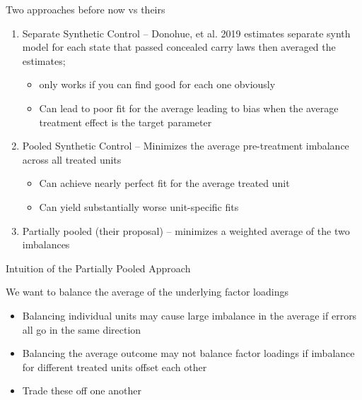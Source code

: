 \documentclass{beamer}
\begin{document}
\begin{frame}{Two approaches before now vs theirs}

\begin{enumerate}

\item Separate Synthetic Control -- Donohue, et al. 2019 estimates separate synth model for each state that passed concealed carry laws then averaged the estimates;
	\begin{itemize}
	\item  only works if you can find good for each one obviously
	\item Can lead to poor fit for the average leading to bias when the average treatment effect is the target parameter
	\end{itemize}
\item Pooled Synthetic Control -- Minimizes the average pre-treatment imbalance across all treated units
	\begin{itemize}
	\item Can achieve nearly perfect fit for the average treated unit
	\item Can yield substantially worse unit-specific fits
	\end{itemize}
\item Partially pooled (their proposal) -- minimizes a weighted average of the two imbalances

\end{enumerate}

\end{frame}

\begin{frame}{Intuition of the Partially Pooled Approach}

We want to balance the average of the underlying factor loadings

\begin{itemize}
\item Balancing individual units may cause large imbalance in the average if errors all go in the same direction
\item Balancing the average outcome may not balance factor loadings if imbalance for different treated units offset each other
\item Trade these off one another
\end{itemize}

\end{frame}
\end{document}
